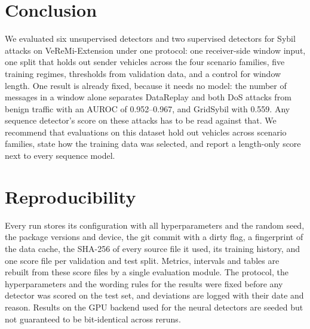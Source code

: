 \section{Conclusion}\label{sec:conclusion}

We evaluated six unsupervised detectors and two supervised detectors for Sybil attacks on VeReMi-Extension under
one protocol: one receiver-side window input, one split that holds out sender vehicles across the four scenario
families, five training regimes, thresholds from validation data, and a control for window length. One result
is already fixed, because it needs no model: the number of messages in a window alone separates DataReplay and
both DoS attacks from benign traffic with an AUROC of 0.952--0.967, and GridSybil with 0.559. Any sequence
detector's score on these attacks has to be read against that.  We recommend that evaluations
on this dataset hold out vehicles across scenario families, state how the training data was selected, and report
a length-only score next to every sequence model.

\section*{Reproducibility}

Every run stores its configuration with all hyperparameters and the random seed, the package versions and device,
the git commit with a dirty flag, a fingerprint of the data cache, the SHA-256 of every source file it used, its
training history, and one score file per validation and test split. Metrics, intervals and tables are rebuilt from
these score files by a single evaluation module. The protocol, the hyperparameters and the wording rules for the
results were fixed before any detector was scored on the test set, and deviations are logged with their date and
reason. Results on the GPU backend used for the neural detectors are seeded but not guaranteed to be bit-identical
across reruns. 
